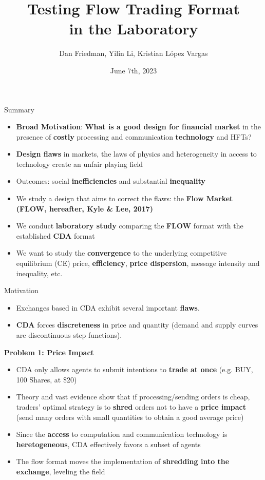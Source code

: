 \documentclass[10pt]{beamer}
\title[Flow Trading]{Testing Flow Trading Format \\in the Laboratory}
\author[YL]{Dan Friedman, Yilin Li, Kristian L\'opez Vargas}
\institute[UCSC]{University of California, Santa Cruz}
\date[June 2023]{June 7th, 2023}
\begin{document}
\maketitle

\begin{frame}{Summary}
    \begin{itemize}
        \item \textbf{Broad Motivation}: \textbf{What is a good design for financial market} in the presence of \textbf{costly} processing and communication \textbf{technology} and HFTs?
        \item \textbf{Design flaws} in markets, the laws of physics and heterogeneity in access to technology create  an unfair playing field
        \item Outcomes: social \textbf{inefficiencies} and substantial \textbf{inequality}
        \item We study a design that aims to correct the flaws: the \textbf{Flow Market (FLOW, hereafter, Kyle \& Lee, 2017)}
        \item We conduct \textbf{laboratory study} comparing the \textbf{FLOW} format with the established \textbf{CDA} format
        \item We want to study the \textbf{convergence} to the underlying competitive equilibrium (CE) price, \textbf{efficiency}, \textbf{price dispersion}, message intensity and inequality, etc. 
    \end{itemize}
\end{frame}

\begin{frame}{Motivation}
    \begin{itemize}
        \item Exchanges based in CDA exhibit several important \textbf{flaws}.
        \item \textbf{CDA} forces \textbf{discreteness} in price and quantity (demand and supply curves are discontinuous step functions). 
    \end{itemize}
    \textbf{Problem 1: Price Impact} 
    \begin{itemize}
        \item CDA only allows agents to submit intentions to \textbf{trade at once} (e.g. BUY, 100 Shares, at \$20)
        \item Theory and vast evidence show that if processing/sending orders is cheap, traders' optimal strategy is to \textbf{shred} orders not to have a \textbf{price impact} (send many orders with small quantities to obtain a good average price)
        \item Since the \textbf{access} to computation and communication technology is \textbf{heretogeneous}, CDA effectively favors a subset of agents
        \item The flow format moves the implementation of \textbf{shredding into the exchange}, leveling the field
    \end{itemize}
\end{frame}
\end{document}
